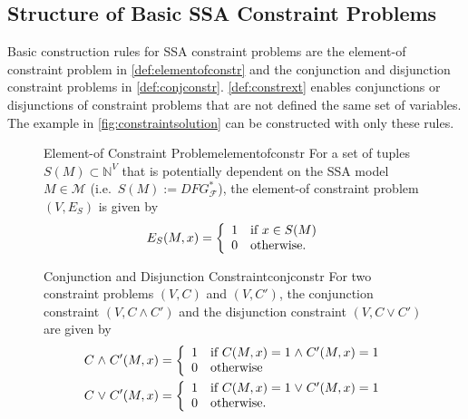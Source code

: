 \subsection{Structure of Basic SSA Constraint Problems}

    Basic construction rules for SSA constraint problems are the
    element-of constraint problem in \autoref{def:elementofconstr}
    and the conjunction and disjunction constraint problems in
    \autoref{def:conjconstr}.
    \autoref{def:constrext} enables conjunctions or disjunctions of constraint
    problems that are not defined the same set of variables.
    The example in \autoref{fig:constraintsolution} can be constructed with only
    these rules.

\begin{figure}[p]
    \begin{definition}{Element-of Constraint Problem}{elementofconstr}
        For a set of tuples $S(M)\subset\mathbb N^V$ that is potentially
        dependent on the SSA model $M\in\mathcal M$
        (i.e.\ $S(M):=DFG_\mathcal F^*$),
        the element-of constraint problem $(V,E_S)$ is given by
        \begin{align*}
            E_S(M,x)=\left\{\begin{array}{l}
                                1\text{\quad if }x \in S(M)\\
                                0\text{\quad otherwise}.
                            \end{array}\right.
        \end{align*}
    \end{definition}

    \begin{definition}{Conjunction and Disjunction Constraint}{conjconstr}
        For two constraint problems $(V,C)$ and $(V,C')$, the
        conjunction constraint $(V,C\mathrel\land C')$ and the
        disjunction constraint $(V,C\mathrel\lor C')$ are given by
        \begin{align*}
            &C\mathrel\land C'(M,x)=\left\{
                \begin{array}{l}
                    1\text{\quad if }C(M,x)=1\mathrel\land C'(M,x)=1\\
                    0\text{\quad otherwise}
                \end{array}\right.\\
            &C\mathrel\lor C'(M,x)=\left\{
                \begin{array}{l}
                    1\text{\quad if }C(M,x)=1\mathrel\lor C'(M,x)=1\\
                    0\text{\quad otherwise}.
                \end{array}\right.
        \end{align*}
    \end{definition}


\end{figure}
